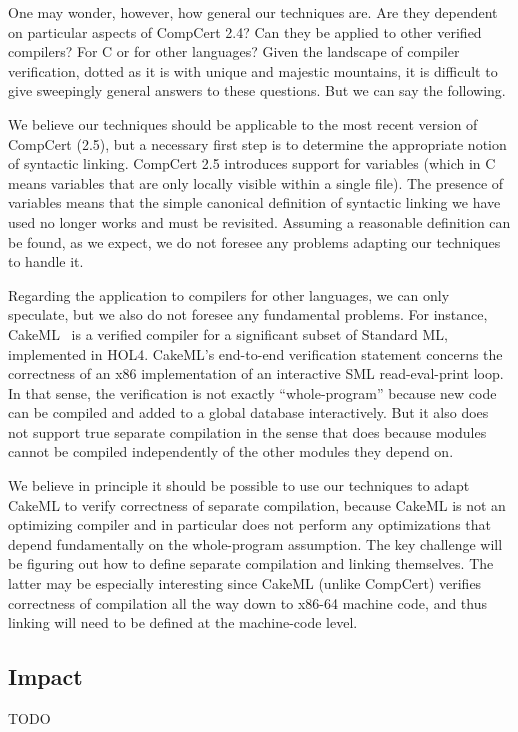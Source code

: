 One may wonder, however, how general our techniques are.  Are they
dependent on particular aspects of CompCert 2.4?  Can they be applied
to other verified compilers?  For C or for other languages?  Given the
landscape of compiler verification, dotted as it is with unique and
majestic mountains, it is difficult to give sweepingly general answers
to these questions.  But we can say the following.

We believe our techniques should be applicable to the most recent
version of CompCert (2.5), but a necessary first step is to determine
the appropriate notion of syntactic linking.  CompCert 2.5 introduces
support for  variables (which in C means variables that are
only locally visible within a single file).  The presence of
 variables means that the simple canonical definition of
syntactic linking we have used no longer works and must be revisited.
Assuming a reasonable definition can be found, as we expect, we do not
foresee any problems adapting our techniques to handle it.

Regarding the application to compilers for other languages, we can
only speculate, but we also do not foresee any fundamental problems.
For instance, CakeML~\cite{cakeml} is a verified compiler for a
significant subset of Standard ML, implemented in HOL4.  CakeML's
end-to-end verification statement concerns the correctness of an x86
implementation of an interactive SML read-eval-print loop.  In that
sense, the verification is not exactly ``whole-program'' because new
code can be compiled and added to a global database interactively.
But it also does not support true separate compilation in the sense
that \sepcomp{} does because modules cannot be compiled independently
of the other modules they depend on.

We believe in principle it should be possible to use our techniques to
adapt CakeML to verify correctness of separate compilation, because
CakeML is not an optimizing compiler and in particular does not
perform any optimizations that depend fundamentally on the
whole-program assumption.  The key challenge will be figuring out how
to define separate compilation and linking themselves.  The latter may
be especially interesting since CakeML (unlike CompCert) verifies
correctness of compilation all the way down to x86-64 machine code,
and thus linking will need to be defined at the machine-code level.


\subsection{Impact}

TODO



